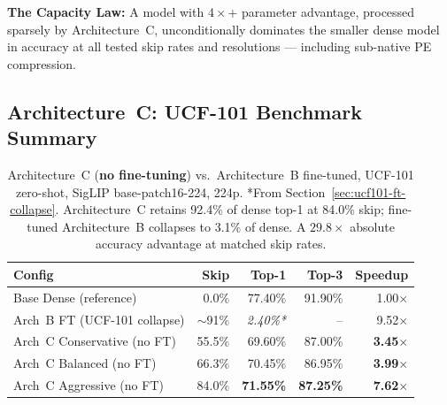 \documentclass{article}
\begin{document}
\textbf{The Capacity Law:} A model with $4\times$+ parameter advantage,
processed sparsely by Architecture~C, unconditionally dominates the
smaller dense model in accuracy at all tested skip rates and
resolutions — including sub-native PE compression.

\subsection{Architecture~C: UCF-101 Benchmark Summary}
\label{sec:arch-c-results}

\begin{table}[htbp]
\centering
\setlength{\tabcolsep}{5pt}
\renewcommand{\arraystretch}{1.15}
\begin{tabular}{lrrrr}
\toprule
\textbf{Config} & \textbf{Skip} & \textbf{Top-1} & \textbf{Top-3}
  & \textbf{Speedup} \\
\midrule
Base Dense (reference)       &  0.0\% & 77.40\% & 91.90\% & 1.00$\times$ \\
Arch~B FT (UCF-101 collapse) & $\sim$91\% & \textit{2.40\%*} & -- & 9.52$\times$ \\
\midrule
Arch~C Conservative (no FT)  & 55.5\% & 69.60\% & 87.00\% & \textbf{3.45}$\times$ \\
Arch~C Balanced (no FT)      & 66.3\% & 70.45\% & 86.95\% & \textbf{3.99}$\times$ \\
Arch~C Aggressive (no FT)    & 84.0\% & \textbf{71.55\%} & \textbf{87.25\%} & \textbf{7.62}$\times$ \\
\bottomrule
\end{tabular}
\caption{Architecture~C (\textbf{no fine-tuning}) vs.\ Architecture~B
fine-tuned, UCF-101 zero-shot, SigLIP base-patch16-224, 224p.
*From Section~\ref{sec:ucf101-ft-collapse}. Architecture~C retains
92.4\% of dense top-1 at 84.0\% skip; fine-tuned Architecture~B
collapses to 3.1\% of dense. A $29.8\times$ absolute accuracy advantage
at matched skip rates.}
\label{tab:arch-c-benchmark}
\end{table}
\end{document}
